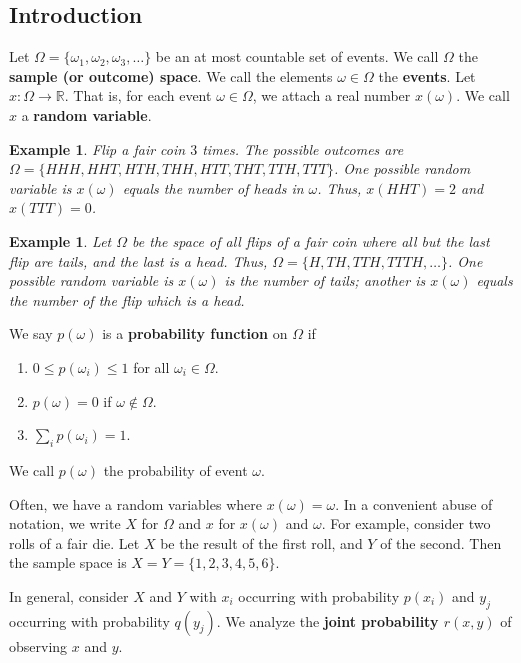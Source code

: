 \documentclass[12pt,letterpaper]{report}
\newcommand\ben{\begin{enumerate}}
\newcommand\een{\end{enumerate}}
\newcommand{\R}{\ensuremath{\mathbb{R}}}
\newtheorem{exa}[thm]{Example}
\begin{document}
\subsection{Introduction}

Let $\Omega = \{\omega_1, \omega_2, \omega_3, \dots \}$ be an at
most countable set of events. We call $\Omega$ the \textbf{sample
(or outcome) space}. We call the elements $\omega \in \Omega$ the
\textbf{events}. Let $x: \Omega \rightarrow \R$. That is, for each
event $\omega \in \Omega$, we attach a real number $x(\omega)$. We
call $x$ a \textbf{random variable}.

\begin{exa} Flip a fair coin $3$ times. The possible
outcomes are $\Omega = \{HHH, HHT, HTH, THH, HTT, THT, TTH,
TTT\}$. One possible random variable is $x(\omega)$ equals the
number of heads in $\omega$. Thus, $x(HHT) = 2$ and $x(TTT) = 0$.
\end{exa}

\begin{exa} Let $\Omega$ be the space of all flips of a fair coin where
all but the last flip are tails, and the last is a head. Thus,
$\Omega = \{H, TH, TTH, TTTH, \dots \}$. One possible random
variable is $x(\omega)$ is the number of tails; another is
$x(\omega)$ equals the number of the flip which is a head.
\end{exa}

We say $p(\omega)$ is a \textbf{probability function} on $\Omega$
if

\ben
\item $0 \le p(\omega_i) \le 1$ for all $\omega_i \in \Omega$.

\item $p(\omega) = 0$ if $\omega \not\in \Omega$.

\item $\sum_i p(\omega_i) = 1$.
\een

We call $p(\omega)$ the probability of event $\omega$.

Often, we have a random variables where $x(\omega) = \omega$. In a
convenient abuse of notation, we write $X$ for $\Omega$ and $x$
for $x(\omega)$ and $\omega$. For example, consider two rolls of a
fair die. Let $X$ be the result of the first roll, and $Y$ of the
second. Then the sample space is $X = Y = \{1, 2, 3, 4, 5, 6\}$.

In general, consider $X$ and $Y$ with $x_i$ occurring with
probability $p(x_i)$ and $y_j$ occurring with probability
$q(y_j)$. We analyze the \textbf{joint probability $r(x,y)$} of
observing $x$ and $y$.
\end{document}
